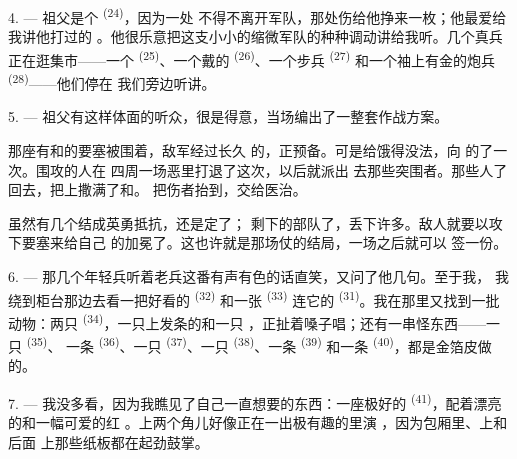 \VUsaut{4.0mm}
\VUsaut{2.8mm}

4. --- 祖父是个 \textsuperscript{(24)}，因为一处
不得不离开军队，那处伤给他挣来一枚；他最爱给我讲他打过的
。他很乐意把这支小小的缩微军队的种种调动讲给我听。几个真兵
正在逛集市——一个 \textsuperscript{(25)}、一个戴的
 \textsuperscript{(26)}、一个步兵 \textsuperscript{(27)}
和一个袖上有金的炮兵 \textsuperscript{(28)}——他们停在
我们旁边听讲。

5. --- 祖父有这样体面的听众，很是得意，当场编出了一整套作战方案。

那座有和的要塞被围着，敌军经过长久
的，正预备。可是给饿得没法，向
的了一次。围攻的人在
四周一场恶里打退了这次，以后就派出
去那些突围者。那些人了
回去，把上撒满了和。
把伤者抬到，交给医治。

虽然有几个结成英勇抵抗，还是定了；
剩下的部队了，丢下许多。敌人就要以攻下要塞来给自己
的加冕了。这也许就是那场仗的结局，一场之后就可以
签一份。

\VUsaut{4.4mm}
\VUsaut{2.8mm}

6. --- 那几个年轻兵听着老兵这番有声有色的话直笑，又问了他几句。至于我，
我绕到柜台那边去看一把好看的 \textsuperscript{(32)} 和一张
\textsuperscript{(33)} 连它的 \textsuperscript{(31)}。我在那里又找到一批
动物：两只 \textsuperscript{(34)}，一只上发条的和一只
，正扯着嗓子唱；还有一串怪东西——一只 \textsuperscript{(35)}、
一条 \textsuperscript{(36)}、一只 \textsuperscript{(37)}、一只
 \textsuperscript{(38)}、一条 \textsuperscript{(39)} 和一条
 \textsuperscript{(40)}，都是金箔皮做的。

7. --- 我没多看，因为我瞧见了自己一直想要的东西：一座极好的
 \textsuperscript{(41)}，配着漂亮的和一幅可爱的红
。上两个角儿好像正在一出极有趣的里演
，因为包厢里、上和后面
上那些纸板都在起劲鼓掌。

